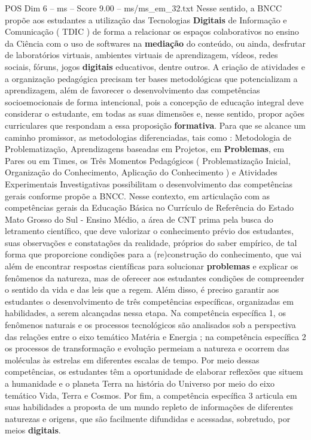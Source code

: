 \begin{textsample}{POS Dim 6 – ms – Score 9.00 – ms/ms\_em\_32.txt}
Nesse sentido, a BNCC propõe aos estudantes a utilização das Tecnologias \textbf{Digitais} de Informação e Comunicação ( TDIC ) de forma a relacionar os espaços colaborativos no ensino da Ciência com o uso de softwares na \textbf{mediação} do conteúdo, ou ainda, desfrutar de laboratórios virtuais, ambientes virtuais de aprendizagem, vídeos, redes sociais, fóruns, jogos \textbf{digitais} educativos, dentre outros.
A criação de atividades e a organização pedagógica precisam ter bases metodológicas que potencializam a aprendizagem, além de favorecer o desenvolvimento das competências socioemocionais de forma intencional, pois a concepção de educação integral deve considerar o estudante, em todas as suas dimensões e, nesse sentido, propor ações curriculares que respondam a essa proposição \textbf{formativa}.
Para que se alcance um caminho promissor, as metodologias diferenciadas, tais como : Metodologia de Problematização, Aprendizagens baseadas em Projetos, em \textbf{Problemas}, em Pares ou em Times, os Três Momentos Pedagógicos ( Problematização Inicial, Organização do Conhecimento, Aplicação do Conhecimento ) e Atividades Experimentais Investigativas possibilitam o desenvolvimento das competências gerais conforme propõe a BNCC.
Nesse contexto, em articulação com as competências gerais da Educação Básica no Currículo de Referência do Estado Mato Grosso do Sul - Ensino Médio, a área de CNT prima pela busca do letramento científico, que deve valorizar o conhecimento prévio dos estudantes, suas observações e constatações da realidade, próprios do saber empírico, de tal forma que proporcione condições para a (re)construção do conhecimento, que vai além de encontrar respostas científicas para solucionar \textbf{problemas} e explicar os fenômenos da natureza, mas de oferecer aos estudantes condições de compreender o sentido da vida e das leis que a regem.
Além disso, é preciso garantir aos estudantes o desenvolvimento de três competências específicas, organizadas em habilidades, a serem alcançadas nessa etapa.
Na competência específica 1, os fenômenos naturais e os processos tecnológicos são analisados sob a perspectiva das relações entre o eixo temático Matéria e Energia ; na competência específica 2 os processos de transformação e evolução permeiam a natureza e ocorrem das moléculas às estrelas em diferentes escalas de tempo.
Por meio dessas competências, os estudantes têm a oportunidade de elaborar reflexões que situem a humanidade e o planeta Terra na história do Universo por meio do eixo temático Vida, Terra e Cosmos.
Por fim, a competência específica 3 articula em suas habilidades a proposta de um mundo repleto de informações de diferentes naturezas e origens, que são facilmente difundidas e acessadas, sobretudo, por meios \textbf{digitais}.

\end{textsample}
